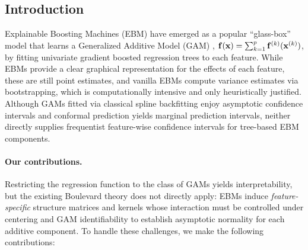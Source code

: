 \subsection{Introduction}
	Explainable Boosting Machines (EBM) \citep{yin2012intelligible, nori2019interpretmlunifiedframeworkmachine} have emerged as a popular ``glass-box'' model that learns a Generalized Additive Model (GAM) \citep{hastie1986gams}, $\mathbf{f}(\mathbf{x}) = \sum_{k=1}^{p}\mathbf{f}^{(k)}(\mathbf{x}^{(k)})$, by fitting univariate gradient boosted regression trees to each feature. While EBMs provide a clear graphical representation for the effects of each feature, these are still point estimates, and vanilla EBMs \citep{yin2012intelligible} compute variance estimates via bootstrapping, which is computationally intensive and only heuristically justified. Although GAMs fitted via classical spline backfitting enjoy asymptotic confidence intervals \citep{2f43af29-e27b-3b6f-9c3a-d7c3bd53adac} and conformal prediction yields marginal prediction intervals, neither directly supplies frequentist feature-wise confidence intervals for tree-based EBM components. 

    \paragraph{Our contributions.}
     Restricting the regression function to the class of GAMs yields interpretability, but the existing Boulevard theory \citep{zhou2022boulevard, fang2025statistical} does not directly apply: EBMs induce \emph{feature-specific} structure matrices and kernels whose interaction must be controlled under centering and GAM identifiability to establish asymptotic normality for each additive component. To handle these challenges, we make the following contributions:
     
